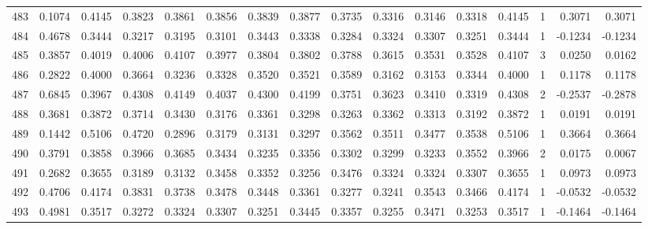 \begin{tabular}{lrrrrrrrrrrrrrrr}
483 &      0.1074 &  0.4145 &  0.3823 &  0.3861 &  0.3856 &  0.3839 &  0.3877 &  0.3735 &  0.3316 &  0.3146 &   0.3318 &     0.4145 &      1 &                    0.3071 &                     0.3071 \\
484 &      0.4678 &  0.3444 &  0.3217 &  0.3195 &  0.3101 &  0.3443 &  0.3338 &  0.3284 &  0.3324 &  0.3307 &   0.3251 &     0.3444 &      1 &                   -0.1234 &                    -0.1234 \\
485 &      0.3857 &  0.4019 &  0.4006 &  0.4107 &  0.3977 &  0.3804 &  0.3802 &  0.3788 &  0.3615 &  0.3531 &   0.3528 &     0.4107 &      3 &                    0.0250 &                     0.0162 \\
486 &      0.2822 &  0.4000 &  0.3664 &  0.3236 &  0.3328 &  0.3520 &  0.3521 &  0.3589 &  0.3162 &  0.3153 &   0.3344 &     0.4000 &      1 &                    0.1178 &                     0.1178 \\
487 &      0.6845 &  0.3967 &  0.4308 &  0.4149 &  0.4037 &  0.4300 &  0.4199 &  0.3751 &  0.3623 &  0.3410 &   0.3319 &     0.4308 &      2 &                   -0.2537 &                    -0.2878 \\
488 &      0.3681 &  0.3872 &  0.3714 &  0.3430 &  0.3176 &  0.3361 &  0.3298 &  0.3263 &  0.3362 &  0.3313 &   0.3192 &     0.3872 &      1 &                    0.0191 &                     0.0191 \\
489 &      0.1442 &  0.5106 &  0.4720 &  0.2896 &  0.3179 &  0.3131 &  0.3297 &  0.3562 &  0.3511 &  0.3477 &   0.3538 &     0.5106 &      1 &                    0.3664 &                     0.3664 \\
490 &      0.3791 &  0.3858 &  0.3966 &  0.3685 &  0.3434 &  0.3235 &  0.3356 &  0.3302 &  0.3299 &  0.3233 &   0.3552 &     0.3966 &      2 &                    0.0175 &                     0.0067 \\
491 &      0.2682 &  0.3655 &  0.3189 &  0.3132 &  0.3458 &  0.3352 &  0.3256 &  0.3476 &  0.3324 &  0.3324 &   0.3307 &     0.3655 &      1 &                    0.0973 &                     0.0973 \\
492 &      0.4706 &  0.4174 &  0.3831 &  0.3738 &  0.3478 &  0.3448 &  0.3361 &  0.3277 &  0.3241 &  0.3543 &   0.3466 &     0.4174 &      1 &                   -0.0532 &                    -0.0532 \\
493 &      0.4981 &  0.3517 &  0.3272 &  0.3324 &  0.3307 &  0.3251 &  0.3445 &  0.3357 &  0.3255 &  0.3471 &   0.3253 &     0.3517 &      1 &                   -0.1464 &                    -0.1464 \\

\end{tabular}

